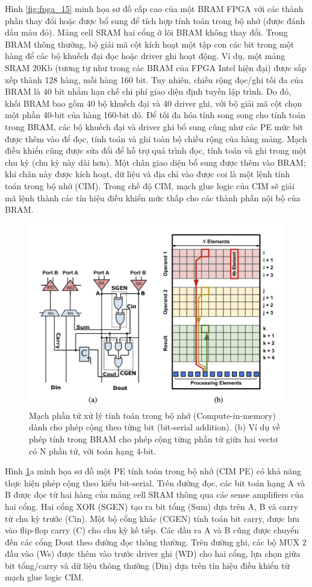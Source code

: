 \documentclass[a4paper]{article}
\begin{document}
Hình \ref{fig:fpga_15} minh họa sơ đồ cấp cao của một BRAM FPGA với các thành phần thay đổi hoặc được bổ sung để tích hợp tính toán trong bộ nhớ (được đánh dấu màu đỏ). Mảng cell SRAM hai cổng ở lõi BRAM không thay đổi. Trong BRAM thông thường, bộ giải mã cột kích hoạt một tập con các bit trong một hàng để các bộ khuếch đại đọc hoặc driver ghi hoạt động. Ví dụ, một mảng SRAM 20Kb (tương tự như trong các BRAM của FPGA Intel hiện đại) được sắp xếp thành 128 hàng, mỗi hàng 160 bit. Tuy nhiên, chiều rộng đọc/ghi tối đa của BRAM là 40 bit nhằm hạn chế chi phí giao diện định tuyến lập trình. Do đó, khối BRAM bao gồm 40 bộ khuếch đại và 40 driver ghi, với bộ giải mã cột chọn một phần 40-bit của hàng 160-bit đó. Để tối đa hóa tính song song cho tính toán trong BRAM, các bộ khuếch đại và driver ghi bổ sung cũng như các PE mức bit được thêm vào để đọc, tính toán và ghi toàn bộ chiều rộng của hàng mảng. Mạch điều khiển cũng được sửa đổi để hỗ trợ quá trình đọc, tính toán và ghi trong một chu kỳ (chu kỳ này dài hơn). Một chân giao diện bổ sung được thêm vào BRAM; khi chân này được kích hoạt, dữ liệu và địa chỉ vào được coi là một lệnh tính toán trong bộ nhớ (CIM). Trong chế độ CIM, mạch glue logic của CIM sẽ giải mã lệnh thành các tín hiệu điều khiển mức thấp cho các thành phần nội bộ của BRAM.

\begin{figure}
    \centering
    \includegraphics[width=0.75\linewidth]{assets/fpga_16.png}
    \caption{Mạch phần tử xử lý tính toán trong bộ nhớ (Compute-in-memory) dành cho phép cộng theo từng bit (bit-serial addition).
(b) Ví dụ về phép tính trong BRAM cho phép cộng từng phần tử giữa hai vectơ có N phần tử, với toán hạng 4-bit.}
    \label{fig:fpga_16}
\end{figure}

Hình \ref{fig:fpga_16}a minh họa sơ đồ một PE tính toán trong bộ nhớ (CIM PE) có khả năng thực hiện phép cộng theo kiểu bit-serial. Trên đường đọc, các bit toán hạng A và B được đọc từ hai hàng của mảng cell SRAM thông qua các sense amplifiers của hai cổng. Hai cổng XOR (SGEN) tạo ra bit tổng (Sum) dựa trên A, B và carry từ chu kỳ trước (Cin). Một bộ cổng khác (CGEN) tính toán bit carry, được lưu vào flip-flop carry (C) cho chu kỳ kế tiếp. Các đầu ra A và B cũng được chuyển đến các cổng Dout theo đường đọc thông thường. Trên đường ghi, các bộ MUX 2 đầu vào (Ws) được thêm vào trước driver ghi (WD) cho hai cổng, lựa chọn giữa bit tổng/carry và dữ liệu thông thường (Din) dựa trên tín hiệu điều khiển từ mạch glue logic CIM.
\end{document}
